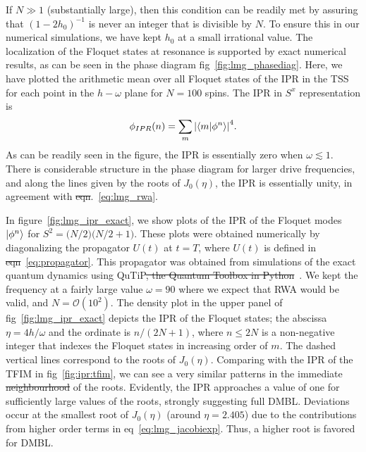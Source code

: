 \documentclass[%
reprint,
superscriptaddress,
amsmath,amssymb,
aps,
prb,
showkeys,
]{revtex4-2}
\providecommand{\DIFaddtex}[1]{{\protect\color{blue}\uwave{#1}}} %
\providecommand{\DIFdeltex}[1]{{\protect\color{red}\sout{#1}}}                      %
\providecommand{\DIFaddbegin}{} %
\providecommand{\DIFaddend}{} %
\providecommand{\DIFdelbegin}{} %
\providecommand{\DIFdelend}{} %
\providecommand{\DIFadd}[1]{\texorpdfstring{\DIFaddtex{#1}}{#1}} %
\providecommand{\DIFdel}[1]{\texorpdfstring{\DIFdeltex{#1}}{}} %
\newcommand{\DIFscaledelfig}{0.5}
\newlength{\DIFdelgraphicswidth} %
\newlength{\DIFdelgraphicsheight} %
\newcommand{\DIFaddincludegraphics}[2][]{{\color{blue}\fbox{\DIFOincludegraphics[#1]{#2}}}} %
\newcommand{\DIFdelincludegraphics}[2][]{%
\sbox{\DIFdelgraphicsbox}{\DIFOincludegraphics[#1]{#2}}%
\settoboxwidth{\DIFdelgraphicswidth}{\DIFdelgraphicsbox} %
\settoboxtotalheight{\DIFdelgraphicsheight}{\DIFdelgraphicsbox} %
\scalebox{\DIFscaledelfig}{%
\parbox[b]{\DIFdelgraphicswidth}{\usebox{\DIFdelgraphicsbox}\\[-\baselineskip] \rule{\DIFdelgraphicswidth}{0em}}\llap{\resizebox{\DIFdelgraphicswidth}{\DIFdelgraphicsheight}{%
\setlength{\unitlength}{\DIFdelgraphicswidth}%
\begin{picture}(1,1)%
\thicklines\linethickness{2pt} %
{\color[rgb]{1,0,0}\put(0,0){\framebox(1,1){}}}%
{\color[rgb]{1,0,0}\put(0,0){\line( 1,1){1}}}%
{\color[rgb]{1,0,0}\put(0,1){\line(1,-1){1}}}%
\end{picture}%
}\hspace*{3pt}}} %
} %
\DeclareRobustCommand{\DIFaddbegin}{\DIFOaddbegin \let\includegraphics\DIFaddincludegraphics} %
\DeclareRobustCommand{\DIFaddend}{\DIFOaddend \let\includegraphics\DIFOincludegraphics} %
\DeclareRobustCommand{\DIFdelbegin}{\DIFOdelbegin \let\includegraphics\DIFdelincludegraphics} %
\DeclareRobustCommand{\DIFdelend}{\DIFOaddend \let\includegraphics\DIFOincludegraphics} %
\begin{document}
If $N\gg 1$ (substantially large), then this condition can be readily met by assuring that $(1-2h_0)^{-1}$ is never an integer that is divisible by $N$. To ensure this in our numerical simulations, we have kept $h_0$ at a small irrational value.
The localization of the Floquet states at resonance is supported by exact numerical results, as can be seen in the phase diagram fig\DIFaddbegin \DIFadd{.}\DIFaddend ~\ref{fig:lmg_phasediag}. Here, we have plotted the arithmetic mean over all Floquet states of the IPR 
in the TSS for each point in the $h-\omega$ plane for $N=100$ spins.  The IPR in $S^x$ representation is
\begin{equation}
	\phi_{IPR}(n) = \sum_m \abs{\ip{m}{\phi^n}}^4.
	\label{eq:ipr:lmg}
\end{equation}
As can be readily seen in the figure, the IPR is essentially zero when  $\omega \lesssim 1$. There is considerable structure in the phase diagram for larger drive frequencies, and along the lines given by the roots of $J_0(\eta)$, the IPR is essentially unity, in agreement with \DIFdelbegin \DIFdel{eqn}\DIFdelend \DIFaddbegin \DIFadd{eq}\DIFaddend .~\ref{eq:lmg_rwa}.

In figure~\ref{fig:lmg_ipr_exact}, we show plots of the IPR of the Floquet modes $\ket{\phi^n}$ for $S^2 = \big(N/2\big)\big(N/2 + 1\big)$.
These plots were obtained numerically by diagonalizing the propagator $U(t)$ at $t=T$, where $U(t)$ is defined in \DIFdelbegin \DIFdel{eqn}\DIFdelend \DIFaddbegin \DIFadd{eq.}\DIFaddend ~\ref{eq:propagator}. This propagator was obtained from simulations of the exact quantum dynamics using QuTiP\DIFdelbegin \DIFdel{, the Quantum Toolbox in Python}\DIFdelend ~\cite{qutip}. We kept the frequency at a fairly large value $\omega = 90$ where we expect that RWA would be valid, and $N=\mathcal{O}(10^2)$. The density plot in the upper panel of fig\DIFaddbegin \DIFadd{.}\DIFaddend ~\ref{fig:lmg_ipr_exact} depicts the IPR of the Floquet states; the abscissa \DIFaddbegin \DIFadd{(x-corrdinate)  }\DIFaddend $\eta=4h/\omega$ and the ordinate is $n/(2N+1)$, where $n\leq 2N$ is a non-negative integer that indexes the Floquet states in increasing order of $m$. The dashed vertical lines correspond to the roots of $J_0(\eta)$. Comparing with the IPR of the TFIM in fig\DIFaddbegin \DIFadd{.}\DIFaddend ~\ref{fig:ipr:tfim}, we can see a very similar patterns in the immediate \DIFdelbegin \DIFdel{neighbourhood }\DIFdelend \DIFaddbegin \DIFadd{neighborhood }\DIFaddend of the roots. Evidently, the IPR approaches a value of one for sufficiently large values of the roots, strongly suggesting full DMBL. Deviations occur at the smallest root of $J_0(\eta)$ (around $\eta = 2.405$) due to the contributions from higher order terms in eq\DIFaddbegin \DIFadd{.}\DIFaddend ~\ref{eq:lmg_jacobiexp}. Thus, a higher root is favored for DMBL.
\end{document}
